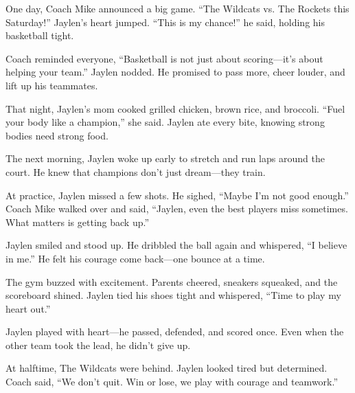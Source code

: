 \documentclass[11pt, a4paper]{article}
\begin{document}
{
One day, Coach Mike announced a big game. “The Wildcats vs. The Rockets this Saturday!” Jaylen’s heart jumped. “This is my chance!” he said, holding his basketball tight.
}

{
Coach reminded everyone, “Basketball is not just about scoring—it’s about helping your team.” Jaylen nodded. He promised to pass more, cheer louder, and lift up his teammates.
}

{
That night, Jaylen’s mom cooked grilled chicken, brown rice, and broccoli. “Fuel your body like a champion,” she said. Jaylen ate every bite, knowing strong bodies need strong food.
}

{
The next morning, Jaylen woke up early to stretch and run laps around the court. He knew that champions don’t just dream—they train.
}

{
At practice, Jaylen missed a few shots. He sighed, “Maybe I’m not good enough.” Coach Mike walked over and said, “Jaylen, even the best players miss sometimes. What matters is getting back up.”
}

{
Jaylen smiled and stood up. He dribbled the ball again and whispered, “I believe in me.” He felt his courage come back—one bounce at a time.
}

{
The gym buzzed with excitement. Parents cheered, sneakers squeaked, and the scoreboard shined. Jaylen tied his shoes tight and whispered, “Time to play my heart out.”
}

{
Jaylen played with heart—he passed, defended, and scored once. Even when the other team took the lead, he didn’t give up.
}

{
At halftime, The Wildcats were behind. Jaylen looked tired but determined. Coach said, “We don’t quit. Win or lose, we play with courage and teamwork.”
}
\end{document}
